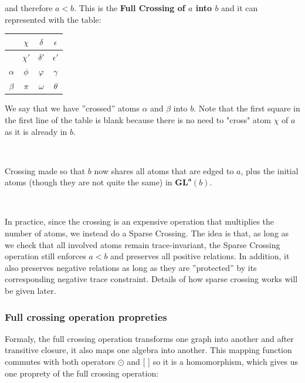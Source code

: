 \documentclass[a4paper, 11pt]{article}
\begin{document}
and therefore $a < b$. This is the \textbf{Full Crossing of $a$ into $b$} and it can represented with the table:

\begin{center}
\begin{tabular}{ c|c|c|c } 
 & $\chi$ & $\delta$ & $\epsilon$ \\ 
 \hline
 & $\chi'$ & $\delta'$ & $\epsilon'$ \\
 \hline
 $\alpha$ & $\phi$ & $\varphi$ & $\gamma$\\ 
 \hline
 $\beta$ & $\pi$ & $\omega$ & $\theta$\\ 
\end{tabular}
\end{center}

We say that we have ”crossed” atoms $\alpha$ and $\beta$ into $b$. Note that the first square in the first line of the table is blank because there is no need to "cross" atom $\chi$ of $a$ as it is already in $b$.

\

Crossing made so that $b$ now shares all atoms that are edged to $a$, plus the initial atoms (though they are not quite the same) in $\boldsymbol{GL}^{\boldsymbol{a}}(b)$.

\

In practice, since the crossing is an expensive operation that multiplies the number of atoms, we instead do a Sparse Crossing. The idea is that, as long as we check that all involved atoms remain trace-invariant, the Sparse Crossing operation still enforces $a < b$ and preserves all positive relations. In addition, it also preserves negative relations as long as they are ”protected” by its corresponding negative trace constraint. Details of how sparse crossing works will be given later.

\subsubsection{Full crossing operation propreties}

Formaly, the full crossing operation transforms one graph into another and after transitive closure, it also maps one algebra into another. This mapping function commutes with both operators $\odot$ and [ ] so it is a homomorphism, which gives us one proprety of the full crossing operation:

\
\end{document}

